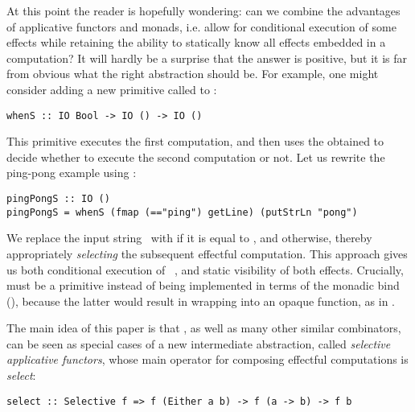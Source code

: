 At this point the reader is hopefully wondering: can we combine the advantages
of applicative functors and monads, i.e. allow for conditional execution of some
effects while retaining the ability to statically know all effects embedded in
a computation? It will hardly be a surprise that the answer is positive, but it
is far from obvious what the right abstraction should be. For example, one might
consider adding a new primitive called  to :

\vspace{0.5mm}
\begin{verbatim}
whenS :: IO Bool -> IO () -> IO ()
\end{verbatim}
\vspace{0.5mm}

\noindent
This primitive executes the first computation, and then uses the obtained
 to decide whether to execute the second computation or not. Let us
rewrite the ping-pong example using :

\vspace{0.5mm}
\begin{verbatim}
pingPongS :: IO ()
pingPongS = whenS (fmap (=="ping") getLine) (putStrLn "pong")
\end{verbatim}
\vspace{0.5mm}

\noindent
We replace the input string~ with  if it is equal to ,
and  otherwise, thereby appropriately \emph{selecting} the subsequent
effectful computation. This approach gives us both conditional execution of
~, and static visibility of both effects. Crucially,
 must be a primitive instead of being implemented in terms of the
monadic bind (\hs{>>=}), because the latter would result in wrapping
 into an opaque function, as in .

The main idea of this paper is that , as well as many other similar
combinators, can be seen as special cases of a new intermediate abstraction,
called \emph{selective applicative functors}, whose main operator for composing
effectful computations is \emph{select}:

\vspace{0.5mm}
\begin{verbatim}
select :: Selective f => f (Either a b) -> f (a -> b) -> f b
\end{verbatim}
\vspace{0.5mm}

